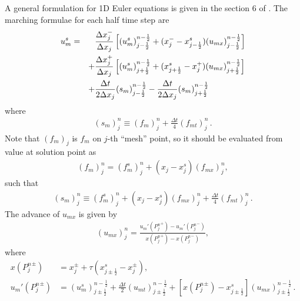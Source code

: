 \documentclass[11pt,dvips]{article}
\numberwithin{equation}{section}
\begin{document}
A general formulation for 1D Euler equations is given in the section 6 of
\cite{chang_not_2008}.  The marching formulae for each half time step are
\begin{alignat}{2}
u_m^s &=
    &&\frac{\Delta x_j^-}{\Delta x_j}
      \left[
          (u_m^s)_{j-\frac{1}{2}}^{n-\frac{1}{2}}
        + (x_j^- - x_{j-\frac{1}{2}}^s)
          (u_{mx})_{j-\frac{1}{2}}^{n-\frac{1}{2}}
      \right] \notag \\
& &+ &\frac{\Delta x_j^+}{\Delta x_j}
      \left[
          (u_m^s)_{j+\frac{1}{2}}^{n-\frac{1}{2}}
        + (x_{j+\frac{1}{2}}^s - x_j^+)
          (u_{mx})_{j+\frac{1}{2}}^{n-\frac{1}{2}}
      \right] \notag \\
& &+ &\frac{\Delta t}{2\Delta x_j}(s_m)_{j-\frac{1}{2}}^{n-\frac{1}{2}}
   -  \frac{\Delta t}{2\Delta x_j}(s_m)_{j+\frac{1}{2}}^{n-\frac{1}{2}}
    \label{e:nonunisys_us}
\end{alignat}
where
\begin{align*}
  (s_m)_j^n \equiv (f_m)_j^n + \frac{\Delta t}{4}(f_{mt})_j^n \,.
\end{align*}
Note that $(f_m)_j$ is $f_m$ on $j$-th ``mesh'' point, so it should be
evaluated from value at solution point as
\begin{align*}
  (f_m)_j^n = (f_m^s)_j^n + (x_j - x_j^s)(f_{mx})_j^n,
\end{align*}
such that
\begin{align}
  (s_m)_j^n \equiv (f_m^s)_j^n + (x_j - x_j^s)(f_{mx})_j^n
                 + \frac{\Delta t}{4}(f_{mt})_j^n \,.
    \label{e:nonunisys_s}
\end{align}
\citep[See also Equation (6.39), (6.40) in][]{chang_not_2008}  The advance of
$u_{mx}$ is given by
\begin{align}
  (u_{mx})_j^n = \frac{u_m'({P_j^n}^+)-u_m'({P_j^n}^-)}
                      {x  ({P_j^n}^+)-x  ({P_j^n}^-)},
    \label{e:nonunisys_ux}
\end{align}
where
\begin{align}
  x({P_j^n}^{\pm}) &=
      x_j^{\pm} + \tau(x_{j\pm\frac{1}{2}}^s-x_j^{\pm}),
    \label{e:nonunisys_xp} \\
  u_m'({P_j^n}^{\pm}) &=
      (u_m^s)_{j\pm\frac{1}{2}}^{n-\frac{1}{2}}
    + \frac{\Delta t}{2}(u_{mt})_{j\pm\frac{1}{2}}^{n-\frac{1}{2}}
    + \left[x({P_j^n}^{\pm})-x_{j\pm\frac{1}{2}}^s\right]
      (u_{mx})_{j\pm\frac{1}{2}}^{n-\frac{1}{2}} \,.
    \label{e:nonunisys_upp}
\end{align}
\citep[See also Equation (6.43), (6.33), (6.41), (6.42) in][]{chang_not_2008}
\end{document}
